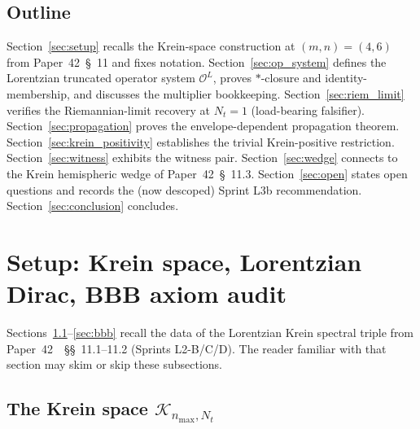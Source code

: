 \documentclass[11pt,a4paper]{article}
\theoremstyle{plain}
\theoremstyle{definition}
\newcommand{\nmax}{n_{\max}}
\newcommand{\Nt}{N_t}
\newcommand{\Krein}{\mathcal{K}}
\newcommand{\Op}{\mathcal{O}}
\begin{document}
\subsection{Outline}

Section~\ref{sec:setup} recalls the Krein-space construction at
$(m, n) = (4, 6)$ from Paper~42~\S~11 and fixes notation.
Section~\ref{sec:op_system} defines the Lorentzian truncated operator
system $\Op^L$, proves $*$-closure and identity-membership, and
discusses the multiplier bookkeeping.
Section~\ref{sec:riem_limit} verifies the Riemannian-limit recovery at
$\Nt = 1$ (load-bearing falsifier).
Section~\ref{sec:propagation} proves the envelope-dependent
propagation theorem.
Section~\ref{sec:krein_positivity} establishes the trivial
Krein-positive restriction.
Section~\ref{sec:witness} exhibits the witness pair.
Section~\ref{sec:wedge} connects to the Krein hemispheric wedge of Paper~42~\S~11.3.
Section~\ref{sec:open} states open questions and records the
(now descoped) Sprint L3b recommendation.
Section~\ref{sec:conclusion} concludes.

\section{Setup: Krein space, Lorentzian Dirac, BBB axiom audit}\label{sec:krein_space}
\label{sec:setup}

Sections~\ref{sec:krein}--\ref{sec:bbb} recall the data of the
Lorentzian Krein spectral triple from
Paper~42~\cite{paper42}~\S\S~11.1--11.2 (Sprints L2-B/C/D). The reader
familiar with that section may skim or skip these subsections.

\subsection{The Krein space $\Krein_{\nmax, \Nt}$}\label{sec:krein}
\end{document}
